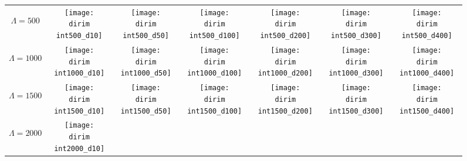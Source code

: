 \begin{figure}[!bt]
	\centering
	\newcommand{\wf}{.12\textwidth}
	\newcommand{\dirim}{\qd gFREM/images/psf3/text_twosources_}
	\newcommand{\vs}{.05}
	\begin{tabular}{c|cccccc}
		\begin{sideways}\hspace{\vs cm}$\Lambda=500$\end{sideways}
		&\texttt{[image: \\dirim int500\_d10]}
		&\texttt{[image: \\dirim int500\_d50]}
		&\texttt{[image: \\dirim int500\_d100]}
		&\texttt{[image: \\dirim int500\_d200]}
		&\texttt{[image: \\dirim int500\_d300]}
		&\texttt{[image: \\dirim int500\_d400]}\\		
		\begin{sideways}\hspace{\vs cm}$\Lambda=1000$\end{sideways}
		&\texttt{[image: \\dirim int1000\_d10]}
		&\texttt{[image: \\dirim int1000\_d50]}
		&\texttt{[image: \\dirim int1000\_d100]}
		&\texttt{[image: \\dirim int1000\_d200]}
		&\texttt{[image: \\dirim int1000\_d300]}
		&\texttt{[image: \\dirim int1000\_d400]}\\
		\begin{sideways}\hspace{\vs cm}$\Lambda=1500$\end{sideways}
		&\texttt{[image: \\dirim int1500\_d10]}
		&\texttt{[image: \\dirim int1500\_d50]}
		&\texttt{[image: \\dirim int1500\_d100]}
		&\texttt{[image: \\dirim int1500\_d200]}
		&\texttt{[image: \\dirim int1500\_d300]}
		&\texttt{[image: \\dirim int1500\_d400]}\\		
		\begin{sideways}\hspace{\vs cm}$\Lambda=2000$\end{sideways}
		&\texttt{[image: \\dirim int2000\_d10]}

\end{tabular}
\end{figure}
